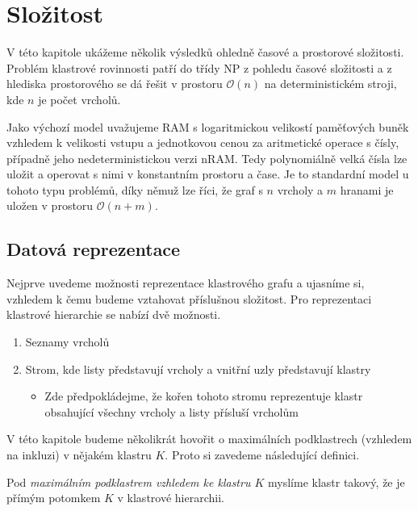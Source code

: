 \chapter{Složitost}
\label{slozitost}

V této kapitole ukážeme několik výsledků ohledně časové a prostorové složitosti.
Problém klastrové rovinnosti patří do třídy NP z pohledu časové složitosti a z hlediska prostorového se dá řešit v prostoru $\mathcal{O}(n)$ na deterministickém stroji, kde $n$ je počet vrcholů.

Jako výchozí model uvažujeme RAM s logaritmickou velikostí paměťových buněk vzhledem k velikosti vstupu a jednotkovou cenou za aritmetické operace s čísly, případně jeho nedeterministickou verzi nRAM. Tedy polynomiálně velká čísla lze uložit a operovat s nimi v konstantním prostoru a čase. Je to standardní model u tohoto typu problémů, díky němuž lze říci, že graf s $n$ vrcholy a $m$ hranami je uložen v prostoru $\mathcal O (n+m)$.

\section{Datová reprezentace}
Nejprve uvedeme možnosti reprezentace klastrového grafu a ujasníme si, vzhledem k čemu budeme vztahovat příslušnou složitost. 
Pro reprezentaci klastrové hierarchie se nabízí dvě možnosti.

\begin{enumerate}
\item Seznamy vrcholů
\item Strom, kde listy představují vrcholy a vnitřní uzly představují klastry
\begin{itemize}
\item Zde předpokládejme, že kořen tohoto stromu reprezentuje klastr obsahující všechny vrcholy a listy přísluší vrcholům
\end{itemize}
\end{enumerate}

V této kapitole budeme několikrát hovořit o maximálních podklastrech (vzhledem na inkluzi) v nějakém klastru $K$. Proto si zavedeme následující definici.
\begin{defn}
Pod \textit{maximálním podklastrem vzhledem ke klastru $K$} myslíme klastr takový, že je přímým potomkem $K$ v klastrové hierarchii.
\end{defn}

